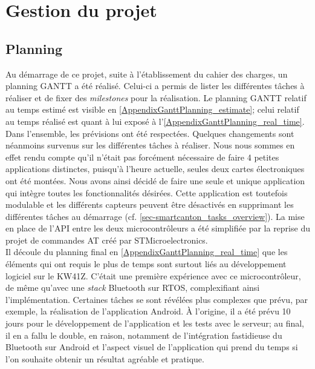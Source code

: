\chapter{Gestion du projet}
\section{Planning}

Au démarrage de ce projet, suite à l'établissement du cahier des charges, un planning GANTT a été réalisé. Celui-ci a permis de lister les différentes tâches à réaliser et de fixer des \textit{milestones} pour la réalisation. Le planning GANTT relatif au temps estimé est visible en \cref{AppendixGanttPlanning_estimate}; celui relatif au temps réalisé est quant à lui exposé à l'\cref{AppendixGanttPlanning_real_time}. \\


Dans l'ensemble, les prévisions ont été respectées. Quelques changements sont néanmoins survenus sur les différentes tâches à réaliser. Nous nous sommes en effet rendu compte qu'il n'était pas forcément nécessaire de faire 4 petites applications distinctes, puisqu'à l'heure actuelle, seules deux cartes électroniques ont été montées. Nous avons ainsi décidé de faire une seule et unique application qui intègre toutes les fonctionnalités désirées. Cette application est toutefois modulable et les différents capteurs peuvent être désactivés en supprimant les différentes tâches au démarrage (cf. \cref{sec-smartcanton_tasks_overview}). La mise en place de l'API entre les deux microcontrôleurs a été simplifiée par la reprise du projet de commandes AT créé par STMicroelectronics.\\


Il découle du planning final en \cref{AppendixGanttPlanning_real_time} que les éléments qui ont requis le plus de temps sont surtout liés au développement logiciel sur le KW41Z. C'était une première expérience avec ce microcontrôleur, de même qu'avec une \textit{stack} Bluetooth sur RTOS, complexifiant ainsi l'implémentation. Certaines tâches se sont révélées plus complexes que prévu, par exemple, la réalisation de l'application Android. À l'origine, il a été prévu 10 jours pour le développement de l'application et les tests avec le serveur; au final, il en a fallu le double, en raison, notamment de l'intégration fastidieuse du Bluetooth sur Android et l'aspect visuel de l'application qui prend du temps si l'on souhaite obtenir un résultat agréable et pratique.\\

